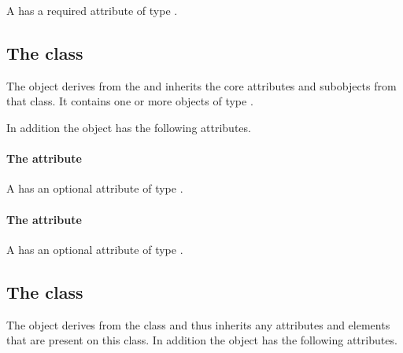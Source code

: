 A \Group has a required attribute  of type
.


\subsection{The  class}
\label{listofmembers-class}


The \ListOfMembers object derives from the  and inherits
the core attributes and subobjects from that class. It contains one or
more objects of type \Member.

In addition the \ListOfMembers object has the following attributes.

\paragraph{The \fixttspace{} attribute}

A \ListOfMembers has an optional attribute  of type
.


\paragraph{The \fixttspace{} attribute}

A \ListOfMembers has an optional attribute  of type
.


\subsection{The  class}
\label{member-class}




The \Member object derives from the \SBase class and thus inherits any
attributes and elements that are present on this class.
In addition the \Member object has the following attributes.

